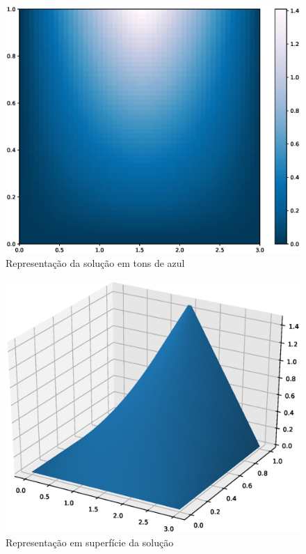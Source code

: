 \documentclass[12pt, a4paper, portuguese]{fphw}
\begin{document}
\begin{figure}[H]
	\centering
	\includegraphics[width=1\linewidth]{graficos/mapadecalor}
	\caption{Representação da solução em tons de azul}
	\label{fig:mapadecalor}
\end{figure}

\begin{figure}[H]
	\centering
	\includegraphics[width=1\linewidth]{graficos/problema2-3d}
	\caption{Representação em superfície da solução}
	\label{fig:problema2-3d}
\end{figure}
\end{document}
